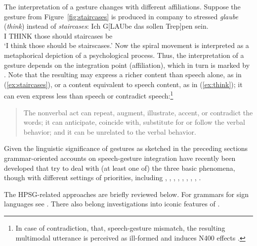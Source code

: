 \documentclass[output=paper]{langsci/langscibook}
\begin{document}
The interpretation of a gesture changes with different affiliations. 
%
Suppose the gesture from Figure~\ref{fig:staircases} is produced in company to stressed \textit{glaube} (\textit{think}) instead of \textit{staircases}: 
%
\ea \label{ex:think}
\gll Ich G[LAUbe das sollen Trep]pen sein.\\
     I THINK those should staircases be \\
\glt \enquote*{I think those should be stairscases.}
\z
%
Now the spiral movement is interpreted as a metaphorical depiction of a psychological process.
%
Thus, the interpretation of a gesture depends on the integration point (affiliation),  which in turn is marked by .
%
Note that the resulting  may express a richer content than speech alone, as in (\ref{ex:staircases}), or a content equivalent to speech content, as in (\ref{ex:think}); it can even express less than speech or contradict speech:\footnote{In case of contradiction, that, speech-gesture mismatch, the resulting multimodal utterance is perceived as ill-formed and induces N400 effects \citep{Wu:Coulson:2005,Kelly:Kravitz:Hopkins:2004}.} 
%
\begin{quote}
The nonverbal act can repeat, augment, illustrate, accent, or contradict the words; it can anticipate, coincide with, substitute for or follow the verbal behavior; and it can be unrelated to the verbal behavior.\hfill 
\citep[53]{Ekman:Friesen:1969}
\end{quote}


Given the linguistic significance of gestures as sketched in the preceding sections grammar-oriented accounts on speech-gesture integration have recently been developed that try to deal with (at least one of) the three basic phenomena, though with different settings of priorities, including
%
\citet{Alahverdzhieva:2013}, %
%
\citet{Alahverdzhieva:Lascarides:2010},
%
\cite{Ebert:2014:a},
%
\citet{Giorgolo:2010},
%
\citet{Giorgolo:Asudeh:2011},
%
\citet{Luecking:2013:a,Luecking:2016},
%
\citet{Rieser:2008,Rieser:2011,Rieser:2015},
%
\citet{Rieser:Poesio:2009},
%
\citet{Schlenker:2018}.


The HPSG-related approaches are briefly reviewed below.
%
For grammars for sign languages see . 
%
There also belong investigations into iconic features of  \citep{Schlenker:Lamberton:Santoro:2013,Schlenker:2014}.
\end{document}
